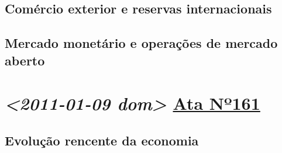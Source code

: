 \documentclass[11pt]{article}
\begin{document}
\subsection*{Comércio exterior e reservas internacionais}
\label{sec:orgc555f18}
\subsection*{Mercado monetário e operações de mercado aberto}
\label{sec:orgd29569d}
\section*{\textit{<2011-01-09 dom> } \href{https://www.bcb.gov.br/publicacoes/atascopom/31082011}{Ata Nº161}}
\label{sec:org24de280}
\subsection*{Evolução rencente da economia}
\label{sec:org6d151a1}
\end{document}
